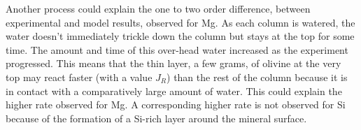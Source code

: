 Another process could explain the one to two order difference, between experimental and model results, observed for Mg. As each column is watered, the water doesn't immediately trickle down the column but stays at the top for some time. The amount and time of this over-head water increased as the experiment progressed. This means that the thin layer, a few grams, of olivine at the very top may react faster (with a value $J_R$) than the rest of the column because it is in contact with a comparatively large amount of water. This could explain the higher rate observed for Mg. A corresponding higher rate is not observed for Si because of the formation of a Si-rich layer around the mineral surface. 
